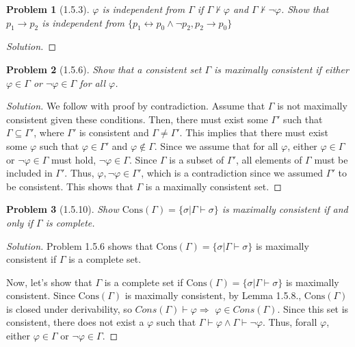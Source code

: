 \documentclass[letter]{article}
\newtheorem{problem}{Problem}
\theoremstyle{definition}
\newenvironment{solution}
{\begin{proof}[Solution]}
        {\end{proof}}
\renewcommand{\phi}{\varphi}
\begin{document}
\begin{problem}[1.5.3] $\phi$ is \textit{independent} from $\Gamma$ if
    $\Gamma \not \vdash \phi$ and $\Gamma \not \vdash \neg \phi$. Show that $p_1 \to p_2$ is independent from $\{p_1 \leftrightarrow p_0 \land \neg p_2, p_2 \to p_0\}$
\end{problem}
\begin{solution}
\end{solution}


\begin{problem}[1.5.6] Show that a consistent set $\Gamma$ is maximally consistent if either
  $\phi \in \Gamma$ or $\neg \phi \in \Gamma$ for all $\phi$.
\end{problem}
\begin{solution}
We follow with proof by contradiction. Assume that $\Gamma$ is not maximally consistent given these
conditions. Then, there must exist some $\Gamma ' $ such that $\Gamma \subseteq \Gamma '$, where
$\Gamma '$ is consistent and $\Gamma \neq \Gamma '$. This implies that there must exist some
$\phi$ such that $\phi \in \Gamma'$ and $\phi \notin \Gamma$. Since we assume that for all $\phi$,
either $\phi \in \Gamma$ or $\neg \phi \in \Gamma$ must hold, $\neg \phi \in \Gamma$.
Since $\Gamma$ is a subset of $\Gamma'$, all elements of $\Gamma$ must be included in $\Gamma'$.
Thus, ${\phi, \neg \phi}\in \Gamma'$, which is a contradiction since we assumed $\Gamma'$ to be
consistent. This shows that $\Gamma$ is a maximally consistent set.
\end{solution}


\begin{problem}[1.5.10] Show $\textrm{Cons}(\Gamma) = \{ \sigma | \Gamma \vdash \sigma \}$ is maximally consistent if and only if $\Gamma$ is complete.
\end{problem}
\begin{solution}

  Problem 1.5.6 shows that $\textrm{Cons}(\Gamma) = \{ \sigma | \Gamma \vdash \sigma \}$ is maximally
  consistent if $\Gamma$ is a complete set.

  Now, let's show that $\Gamma$ is a complete set if $\textrm{Cons}(\Gamma) = \{ \sigma | \Gamma
  \vdash \sigma \}$ is maximally consistent. Since $\textrm{Cons}(\Gamma)$ is maximally consistent,
  by Lemma 1.5.8., $\textrm{Cons}(\Gamma)$ is closed under derivability, so $Cons(\Gamma) \vdash \phi \Rightarrow $
  $\phi \in Cons(\Gamma)$. Since this set is consistent, there does not exist a $\phi$ such that
  $\Gamma \vdash \phi \land \Gamma \vdash \neg \phi$. Thus, forall $\phi$, either $\phi \in \Gamma$
  or $\neg \phi \in \Gamma$.
\end{solution}
\end{document}
